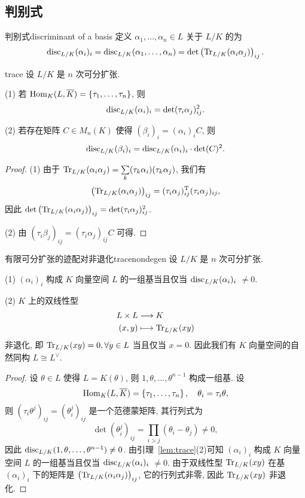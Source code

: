 \subsection{判别式}
\begin{definition}{判别式}{discriminant of a basis}
定义 $\alpha_1,\dots,\alpha_n\in L$ 关于 $L/K$ 的为
  \[{\mathrm{disc}}_{L/K}(\alpha_i)_i={\mathrm{disc}}_{L/K}(\alpha_1,\dots,\alpha_n)=\det\left({\mathrm{Tr}}_{L/K}(\alpha_i\alpha_j)\right)_{ij}.\]
\end{definition}

\begin{lemma}{}{trace}
设 $L/K$ 是 $n$ 次可分扩张.

(1) 若 ${\mathrm{Hom}}_K(L,\overline K)=\left\{\tau_1,\dots,\tau_n\right\}$, 则
  \[{\mathrm{disc}}_{L/K}(\alpha_i)_i=\det(\tau_i \alpha_j)_{ij}^2.\]

(2) 若存在矩阵 $C\in M_n(K)$ 使得 $(\beta_i)_i=(\alpha_i)_i C$, 则
  \[{\mathrm{disc}}_{L/K}(\beta_i)_i={\mathrm{disc}}_{L/K}(\alpha_i)_i\cdot\det(C)^2.\]
\end{lemma}
\begin{proof}
(1) 由于 ${\mathrm{Tr}}_{L/K}(\alpha_i\alpha_j)=\sum\limits_k (\tau_k\alpha_i)(\tau_k\alpha_j)$, 我们有 
  \[\left({\mathrm{Tr}}_{L/K}(\alpha_i\alpha_j)\right)_{ij}=(\tau_i\alpha_j)_{ij}^{\mathrm{T}}(\tau_i\alpha_j)_{ij},\]
因此 $\det\left({\mathrm{Tr}}_{L/K}(\alpha_i\alpha_j)\right)_{ij}=\det(\tau_i\alpha_j)_{ij}^2$.

(2) 由 $(\tau_i\beta_j)_{ij}=(\tau_i\alpha_j)_{ij}C$ 可得.
\end{proof}

\begin{proposition}{有限可分扩张的迹配对非退化}{tracenondegen}
设 $L/K$ 是 $n$ 次可分扩张.

(1) $(\alpha_i)_i$ 构成 $K$ 向量空间 $L$ 的一组基当且仅当 ${\mathrm{disc}}_{L/K}(\alpha_i)_i$ $\neq 0$.

(2) $K$ 上的双线性型 
  \[\begin{split}L\times L &\longrightarrow K \\ (x,y) &\longmapsto {\mathrm{Tr}}_{L/K}(xy)\end{split}\]
非退化, 即 ${\mathrm{Tr}}_{L/K}(xy)=0,\forall y\in L$ 当且仅当 $x=0$. 因此我们有 $K$ 向量空间的自然同构 $L\cong L^\vee$.
\end{proposition}
\begin{proof}
设 $\theta\in L$ 使得 $L=K(\theta)$, 则 $1,\theta,\dots,\theta^{n-1}$ 构成一组基. 设 
  \[{\mathrm{Hom}}_K(L,\overline K)=\left\{\tau_1,\dots,\tau_n\right\},\quad \theta_i=\tau_i \theta,\]
则 $(\tau_i \theta^j)_{ij}=(\theta_i^j)_{ij}$ 是一个范德蒙矩阵, 其行列式为
  \[\det(\theta_i^j)_{ij}=\prod_{i>j}(\theta_i-\theta_j)\neq 0,\]
因此 ${\mathrm{disc}}_{L/K}(1,\theta,\dots,\theta^{n-1})\neq 0$. 由引理~\ref{lem:trace}(2)可知 $(\alpha_i)_i$ 构成 $K$ 向量空间 $L$ 的一组基当且仅当 ${\mathrm{disc}}_{L/K}(\alpha_i)_i$ $\neq 0$.
由于双线性型 ${\mathrm{Tr}}_{L/K}(xy)$ 在基 $(\alpha_i)_i$ 下的矩阵是 $\left({\mathrm{Tr}}_{L/K}(\alpha_i\alpha_j)\right)_{ij}$, 它的行列式非零, 因此 ${\mathrm{Tr}}_{L/K}(xy)$ 非退化.
\end{proof}


